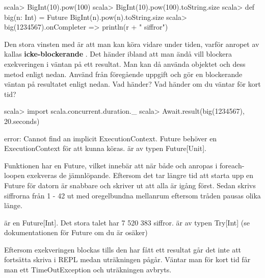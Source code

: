\begin{REPL}
scala> BigInt(10).pow(100)
scala> BigInt(10).pow(100).toString.size
scala> def big(n: Int) = Future { BigInt(n).pow(n).toString.size }
scala> big(1234567).onComplete{r => println(r + " siffror") }
\end{REPL}

\Subtask Den stora vinsten med  är att man kan köra vidare under tiden, varför anropet av  kallas \textbf{icke-blockerande} . Det händer ibland att man ändå vill blockera exekveringen i väntan på ett resultat. Man kan då använda objektet  och dess metod  enligt nedan. Använd  från föregående uppgift och gör en blockerande väntan på resultatet enligt nedan. Vad händer? Vad händer om du väntar för kort tid?

\begin{REPL}
scala> import scala.concurrent.duration._
scala> Await.result(big(1234567), 20.seconds)
\end{REPL}



\SOLUTION


\TaskSolved \what

\SubtaskSolved  error: Cannot find an implicit ExecutionContext. Future behöver en ExecutionContext för att kunna köras.  är av typen Future[Unit].

\SubtaskSolved  Funktionen  har en Future, vilket innebär att när både  och  anropas i foreach-loopen exekveras de jämnlöpande. Eftersom det tar längre tid att starta upp en Future för datorn är  snabbare och skriver ut att alla är igång först. Sedan skrivs siffrorna från 1 - 42 ut med oregelbundna mellanrum eftersom tråden pausas olika länge.

\SubtaskSolved  {} är en Future[Int]. Det stora talet har 7 520 383 siffror.  är av typen Try[Int] (se dokumentationen för Future om du är osäker)

\SubtaskSolved  Eftersom exekveringen blockas tills den har fått ett resultat går det inte att fortsätta skriva i REPL medan uträkningen pågår. Väntar man för kort tid får man ett TimeOutException och uträkningen avbryts.


\QUESTEND







